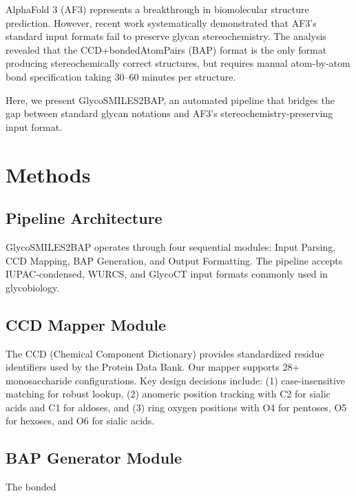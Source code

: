 \documentclass[11pt,a4paper]{article}
\begin{document}
AlphaFold 3 (AF3) represents a breakthrough in biomolecular structure prediction. However, recent work systematically demonstrated that AF3's standard input formats fail to preserve glycan stereochemistry. The analysis revealed that the CCD+bondedAtomPairs (BAP) format is the only format producing stereochemically correct structures, but requires manual atom-by-atom bond specification taking 30--60 minutes per structure.

Here, we present GlycoSMILES2BAP, an automated pipeline that bridges the gap between standard glycan notations and AF3's stereochemistry-preserving input format.

\section{Methods}

\subsection{Pipeline Architecture}

GlycoSMILES2BAP operates through four sequential modules: Input Parsing, CCD Mapping, BAP Generation, and Output Formatting. The pipeline accepts IUPAC-condensed, WURCS, and GlycoCT input formats commonly used in glycobiology.

\subsection{CCD Mapper Module}

The CCD (Chemical Component Dictionary) provides standardized residue identifiers used by the Protein Data Bank. Our mapper supports 28+ monosaccharide configurations. Key design decisions include: (1) case-insensitive matching for robust lookup, (2) anomeric position tracking with C2 for sialic acids and C1 for aldoses, and (3) ring oxygen positions with O4 for pentoses, O5 for hexoses, and O6 for sialic acids.

\subsection{BAP Generator Module}

The bonded
\end{document}
